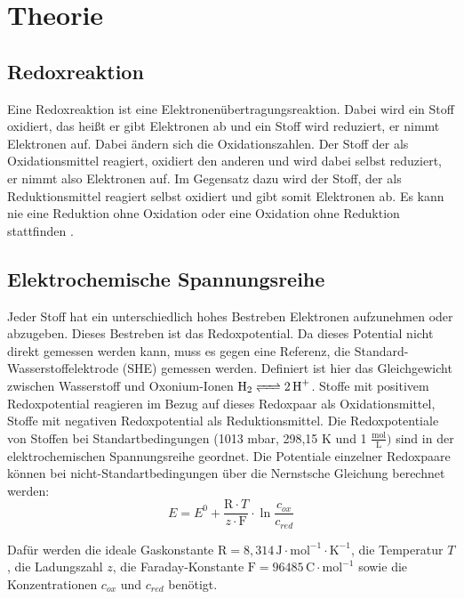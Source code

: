 \documentclass[12pt]{scrartcl} %
\begin{document}
\renewcommand{\thepage}{\Roman{page}}\setcounter{page}{1}
\tableofcontents %
\newpage
\renewcommand{\thepage}{\arabic{page}}\setcounter{page}{1}


\section{Theorie}
\subsection{Redoxreaktion}
Eine Redoxreaktion ist eine Elektronenübertragungsreaktion. Dabei wird ein Stoff oxidiert, das heißt er gibt Elektronen ab und ein Stoff wird reduziert, er nimmt Elektronen auf. Dabei ändern sich die Oxidationszahlen. 
Der Stoff der als Oxidationsmittel reagiert, oxidiert den anderen und wird dabei selbst reduziert, er nimmt also Elektronen auf. Im Gegensatz dazu wird der Stoff, der als Reduktionsmittel reagiert selbst oxidiert und gibt somit Elektronen ab. Es kann nie eine Reduktion ohne Oxidation oder eine Oxidation ohne Reduktion stattfinden \cite{skript}.

\subsection{Elektrochemische Spannungsreihe}
Jeder Stoff hat ein unterschiedlich hohes Bestreben Elektronen aufzunehmen oder abzugeben. Dieses Bestreben ist das Redoxpotential. Da dieses Potential nicht direkt gemessen werden kann, muss es gegen eine Referenz, die Standard-Wasserstoffelektrode (SHE) gemessen werden. Definiert ist hier das Gleichgewicht zwischen Wasserstoff und Oxonium-Ionen $\ce{H2 <=> 2 H+}$. Stoffe mit positivem Redoxpotential reagieren im Bezug auf dieses Redoxpaar als Oxidationsmittel, Stoffe mit negativen Redoxpotential als Reduktionsmittel. Die Redoxpotentiale von Stoffen bei Standartbedingungen (1013 mbar, 298,15 K und 1 $\frac{\text{mol}}{\text{L}})$ sind in der elektrochemischen Spannungsreihe geordnet. Die Potentiale einzelner Redoxpaare können bei nicht-Standartbedingungen über die Nernstsche Gleichung berechnet werden: \cite{skript}
\begin{equation}
    E = E^0 + \frac{\text{R} \cdot T}{z \cdot \text{F}} \cdot \ln{\frac{c_{ox}}{c_{red}}}
\end{equation}

Dafür werden die ideale Gaskonstante $\text{R} = 8,314 \,\text{J} \cdot \text{mol}^{-1} \cdot \text{K}^{-1}$, die Temperatur $T$, die Ladungszahl $z$, die Faraday-Konstante $\text{F} = 96485\,\text{C} \cdot \text{mol}^{-1}$ sowie die Konzentrationen $c_{ox}$ und $c_{red}$ benötigt.
\end{document}
